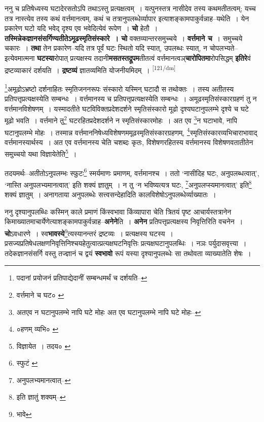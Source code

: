 \documentclass[article,12pt,a4paper]{memoir}
\begin{document}
	  \pstart ननु च प्रतिषेध्यस्य घटादेरसतोऽपि तथाऽस्तु प्रत्यक्षत्वम् । यत्पुनस्तत्र नासीदेव तस्य कथमतीतत्वम्; यच्च तत्र नास्त्येव तस्य कथं वर्त्तमानत्वम्, कथं च तत्रानुपलब्धेर्व्यापार इत्याशङ्कामपाकुर्वन्नाह--यथेति । येन प्रकारेण घटो यदि भवेद् दृश्य एव भवेदित्येवं रूपेण । \textbf{चो} हेतौ । \textbf{तस्मिन्नेकज्ञानसंसर्गिण्यतीतेऽमूढस्मृतिसंस्कारे । चो} वक्तव्यान्तरसमुच्चये । \textbf{वर्त्तमाने च} । समुच्चये चकारः । \textbf{तथा} तेन प्रकारेण--यदि तत्र पूर्वं घटः स्थितो यदि स्यात्, उपलब्धः स्यात्, न चोपलभ्यते--इत्येवमात्मना \textbf{घटस्या}रोपात् प्रत्यक्षस्य तदानी\textbf{मसतस्तद्रूपम}तीतत्वं वर्त्तमानत्वञ्\textbf{चारोपितमा}रोपसिद्धम् \textbf{इतिरे}वं द्रष्टव्याकारं दर्शयति । \textbf{द्रष्टव्यं} ज्ञातव्यमिति योजनीयमिदम् ।
	\pend
      \leavevmode\textsuperscript{\rmlatinfont\tiny [121/dm]}

	  \pstart \footnote{पदानां प्रयोजनं प्रतिपाद्येदानीं सम्बन्धमर्थं च दर्शयति--\cite{dp-msD-n}}अमूढोऽभ्रष्टो दर्शनाहितः स्मृतिजननरूपः संस्कारो यस्मिन् घटादौ स तथोक्तः । तस्य अतीतस्य प्रतिपत्तृप्रत्यक्षस्येति सम्बन्धः । वर्त्तमानस्य च प्रतिपत्तृप्रत्यक्षस्येति सम्बन्धः । अमूढस्मृतिसंस्कारग्रहणं तु न वर्त्तमानविशेषणम् । यस्मादतीते घटविविक्तप्रदेशदर्शने स्मृतिसंस्कारो मूढो दृश्यघटानुपलम्भे दृश्ये च घटे मूढो भवति । वर्त्तमाने तु\footnote{वर्त्तमाने च घट० \cite{dp-msA} \cite{dp-msB} \cite{dp-edP} \cite{dp-edH} \cite{dp-edE} \cite{dp-edN}} घटरहितप्रदेशदर्शने न स्मृतिसंस्कारमोहः । अत एव \footnote{अतएव न घटानुपलम्भे नापि घटे मोहः \cite{dp-msA} \cite{dp-msC} \cite{dp-msD} \cite{dp-edP} \cite{dp-edH} \cite{dp-edE} \cite{dp-edN} अत एव घटानुपलम्भे नापि घटे मोहः--\cite{dp-msB}}न घटाभावे, नापि घटानुपलम्भे मोहः । तस्मान्न वर्त्तमाननिषेध्यविशेषणममूढस्मृतिसंस्कारग्रहणम्, \footnote{०हणम् व्यभि० \cite{dp-msC}}स्मृतिसंस्कारव्यभिचाराभावाद् वर्त्तमानस्यार्थस्य । अत एव वर्त्तमानस्य चेति चशब्दः कृतः, विशेषणरहितस्य वर्त्तमानस्य विशेषणवतातीतेन समुच्चयो यथा विज्ञायेतेति\footnote{विज्ञायेत । तदय० \cite{dp-msB}} ।
	\pend
       

	  \pstart तदयमर्थः--अतीतोऽनुपलम्भः स्फुटः\footnote{स्फुटं \cite{dp-msB} \cite{dp-edP} \cite{dp-edH} \cite{dp-edE} \cite{dp-edN}} स्मर्यमाणः प्रमाणम्, वर्त्तमानश्च । ततो ‘नासीदिह घटः, अनुपलब्धत्वात्’, ‘नास्ति अनुपलभ्यमानत्वात्’ इति शक्यं ज्ञातुम् । न तु ‘न भविष्यत्यत्र घटः, \footnote{अनुपलभ्यमानत्वात्--\cite{dp-msA}}अनुपलप्स्यमानत्वात्’ इति\footnote{इति ज्ञातुं शक्यम्--\cite{dp-msC}} शक्यं ज्ञातुम् । अनागताया अनुपलब्धेः सत्त्वसन्देहादिति कालविशेषोऽनुपलब्धेर्व्याख्यातः ।
	\pend
      

	  \pstart ननु दृश्यानुपलब्धिः कस्मिन् काले प्रमाणं किंस्वभावा किंव्यापारा चेति त्रितयं पृष्ट आचार्यस्तत्रानेन किमाख्यातमाचार्येणेत्याशङ्कामपाकुर्वन्नाह--\textbf{अनेने}ति । \textbf{अनेन} प्रतिपत्तृप्रत्यक्षस्य निवृत्तिरिति वचनेन । \textbf{चो}ऽवधारणे । स्व\textbf{भावस्ये}\footnote{भावे}त्यस्यानन्तरं द्रष्टव्यः । प्रत्यक्षस्य घटस्य । प्रसज्यप्रतिषेधलक्षणनिवृत्तिनिश्चयहेतुत्वात्प्रत्यक्षघटनिवृत्तिः प्रत्यक्षघटानुपलब्धिः । नञः पर्युदासवृत्त्या । तदेकज्ञानसंसर्गि वस्तु तज्ज्ञानं च द्वयं \textbf{स्वभावो} रूपं यस्या दृश्यानुपलब्धेः सा तथोवता व्याख्यातेति शेषः ।
	\pend
      
\end{document}
